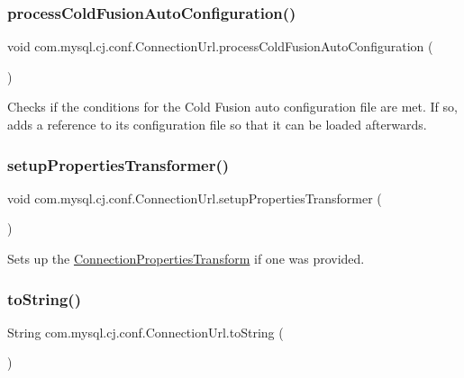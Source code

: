 \subsubsection{\texorpdfstring{process\+Cold\+Fusion\+Auto\+Configuration()}{processColdFusionAutoConfiguration()}}
{\footnotesize\ttfamily void com.\+mysql.\+cj.\+conf.\+Connection\+Url.\+process\+Cold\+Fusion\+Auto\+Configuration (\begin{DoxyParamCaption}{ }\end{DoxyParamCaption})\hspace{0.3cm}{\ttfamily [protected]}}

Checks if the conditions for the Cold Fusion auto configuration file are met. If so, adds a reference to its configuration file so that it can be loaded afterwards. \mbox{\label{classcom_1_1mysql_1_1cj_1_1conf_1_1_connection_url_a1c0bd7599f4e19698b01e25e11fc4686}} 
\subsubsection{\texorpdfstring{setup\+Properties\+Transformer()}{setupPropertiesTransformer()}}
{\footnotesize\ttfamily void com.\+mysql.\+cj.\+conf.\+Connection\+Url.\+setup\+Properties\+Transformer (\begin{DoxyParamCaption}{ }\end{DoxyParamCaption})\hspace{0.3cm}{\ttfamily [protected]}}

Sets up the \mbox{\hyperlink{interfacecom_1_1mysql_1_1cj_1_1conf_1_1_connection_properties_transform}{Connection\+Properties\+Transform}} if one was provided. \mbox{\label{classcom_1_1mysql_1_1cj_1_1conf_1_1_connection_url_aa7ceabc22edf11585cc69a80637d4503}} 
\subsubsection{\texorpdfstring{to\+String()}{toString()}}
{\footnotesize\ttfamily String com.\+mysql.\+cj.\+conf.\+Connection\+Url.\+to\+String (\begin{DoxyParamCaption}{ }\end{DoxyParamCaption})}

